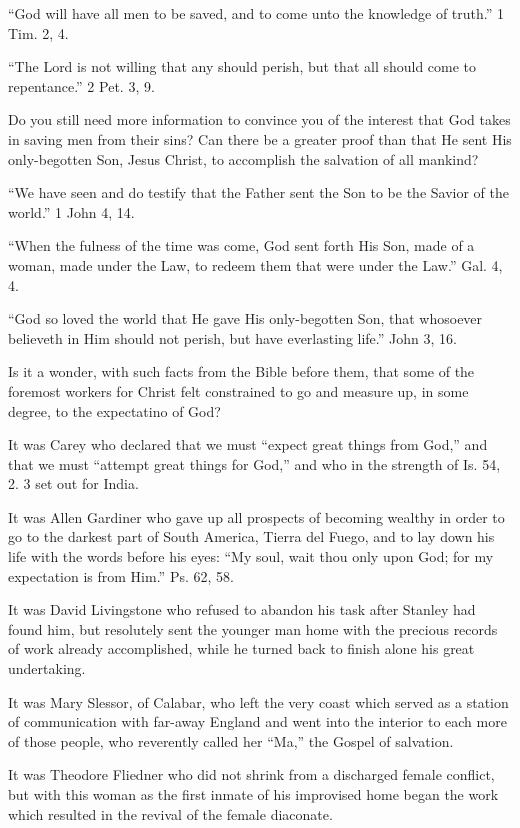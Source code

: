 \documentclass[
]{book}
\begin{document}
``God will have all men to be saved, and to come unto the knowledge of truth.'' 1 Tim. 2, 4.

``The Lord is not willing that any should perish, but that all should come to repentance.'' 2 Pet. 3, 9.

Do you still need more information to convince you of the interest that God takes in saving men from their sins? Can there be a greater proof than that He sent His only-begotten Son, Jesus Christ, to accomplish the salvation of all mankind?

``We have seen and do testify that the Father sent the Son to be the Savior of the world.'' 1 John 4, 14.

``When the fulness of the time was come, God sent forth His Son, made of a woman, made under the Law, to redeem them that were under the Law.'' Gal. 4, 4.

``God so loved the world that He gave His only-begotten Son, that whosoever believeth in Him should not perish, but have everlasting life.'' John 3, 16.

Is it a wonder, with such facts from the Bible before them, that some of the foremost workers for Christ felt constrained to go and measure up, in some degree, to the expectatino of God?

It was Carey who declared that we must ``expect great things from God,'' and that we must ``attempt great things for God,'' and who in the strength of Is. 54, 2. 3 set out for India.

It was Allen Gardiner who gave up all prospects of becoming wealthy in order to go to the darkest part of South America, Tierra del Fuego, and to lay down his life with the words before his eyes: ``My soul, wait thou only upon God; for my expectation is from Him.'' Ps. 62, 58.

It was David Livingstone who refused to abandon his task after Stanley had found him, but resolutely sent the younger man home with the precious records of work already accomplished, while he turned back to finish alone his great undertaking.

It was Mary Slessor, of Calabar, who left the very coast which served as a station of communication with far-away England and went into the interior to each more of those people, who reverently called her ``Ma,'' the Gospel of salvation.

It was Theodore Fliedner who did not shrink from a discharged female conflict, but with this woman as the first inmate of his improvised home began the work which resulted in the revival of the female diaconate.
\end{document}
